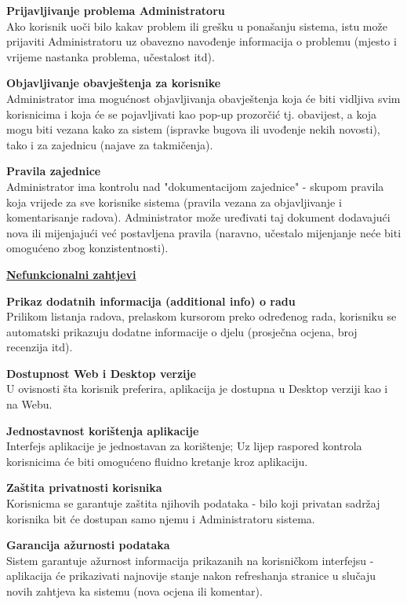 \documentclass[12pt, a4paper]{report}
\begin{document}
\begin{flushleft}
\textbf{Prijavljivanje problema Administratoru} \\
Ako korisnik uoči bilo kakav problem ili grešku u ponašanju sistema, istu može prijaviti Administratoru uz obavezno navođenje informacija o problemu (mjesto i vrijeme nastanka problema, učestalost itd). \newline

\textbf{Objavljivanje obavještenja za korisnike} \\
Administrator ima mogućnost objavljivanja obavještenja koja će biti vidljiva svim korisnicima i koja će se pojavljivati kao pop-up prozorčić tj. obavijest, a koja mogu biti vezana kako za sistem (ispravke bugova ili uvođenje nekih novosti), tako i za zajednicu (najave za takmičenja). \newline

\textbf{Pravila zajednice} \\
Administrator ima kontrolu nad "dokumentacijom zajednice" - skupom pravila koja vrijede za sve korisnike sistema (pravila vezana za objavljivanje i komentarisanje radova). Administrator može uređivati taj dokument dodavajući nova ili mijenjajući već postavljena pravila (naravno, učestalo mijenjanje neće biti omogućeno zbog konzistentnosti). \newline

\textbf{\underline{Nefunkcionalni zahtjevi}} \newline

\textbf{Prikaz dodatnih informacija (additional info) o radu} \\
Prilikom listanja radova, prelaskom kursorom preko određenog rada, korisniku se automatski prikazuju dodatne informacije o djelu (prosječna ocjena, broj recenzija itd). \newline

\textbf{Dostupnost Web i Desktop verzije} \\
U ovisnosti šta korisnik preferira, aplikacija je dostupna u Desktop verziji kao i na Webu. \newline

\textbf{Jednostavnost korištenja aplikacije} \\
Interfejs aplikacije je jednostavan za korištenje; Uz lijep raspored kontrola korisnicima će biti omogućeno fluidno kretanje kroz aplikaciju. \newline

\textbf{Zaštita privatnosti korisnika} \\
Korisnicma se garantuje zaštita njihovih podataka - bilo koji privatan sadržaj korisnika bit će dostupan samo njemu i Administratoru sistema. \newline

\textbf{Garancija ažurnosti podataka} \\
Sistem garantuje ažurnost informacija prikazanih na korisničkom interfejsu - aplikacija će prikazivati najnovije stanje nakon refreshanja stranice u slučaju novih zahtjeva ka sistemu (nova ocjena ili komentar). \newline






\end{flushleft}
\end{document}
